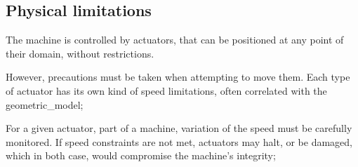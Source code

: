 \subsection{Physical limitations}

The machine is controlled by actuators, that can be positioned at any point of their domain, without restrictions.
\newline

However, precautions must be taken when attempting to move them. Each type of actuator has its own kind of speed
limitations, often correlated with the geometric_model;\newline

For a given actuator, part of a machine, variation of the speed must be carefully monitored.
If speed constraints are not met, actuators may halt, or be damaged, which in both case, would compromise the
machine's integrity;\newline
